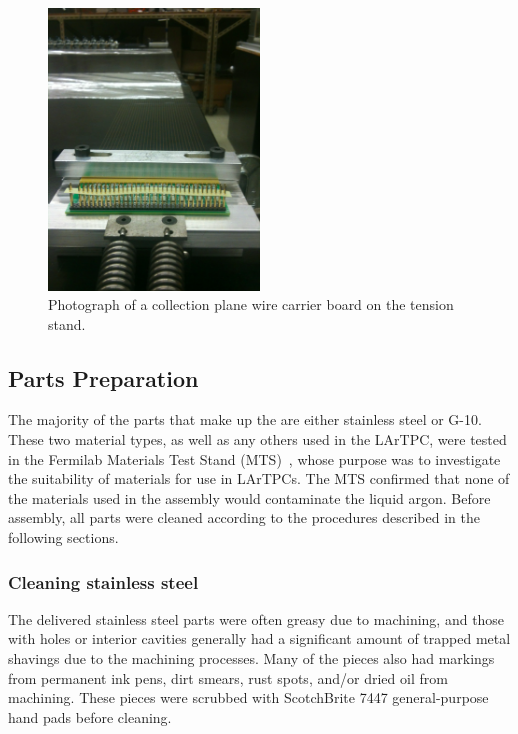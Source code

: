 \begin{figure}
\centering
\includegraphics[angle=0,width=0.5\textwidth]{figures/wire-boardtension.png}
\caption{Photograph of a collection plane wire carrier board on the tension stand.}
\label{fig:stress-stand}
\end{figure}



%
\subsection{Parts Preparation}

The majority of the parts that make up the \lartpc are either stainless steel or G-10. These two material types, as well as any others used in the LArTPC, were tested in the Fermilab Materials Test Stand (MTS)~\cite{Rebel:2011-MTS}, whose purpose was to investigate the suitability of materials for use in LArTPCs.  The MTS confirmed that none of the materials used in the \lartpc assembly would contaminate the liquid argon.  Before assembly, all \lartpc parts were cleaned according to the procedures described in the following sections.

\subsubsection{Cleaning stainless steel}

The delivered stainless steel parts were often greasy due to machining, and those with holes or interior cavities generally had a significant amount of trapped metal shavings due to the machining processes. Many of the pieces also had markings from permanent ink pens, dirt smears, rust spots, and/or dried oil from machining. These pieces were scrubbed with ScotchBrite 7447 general-purpose hand pads before cleaning.

